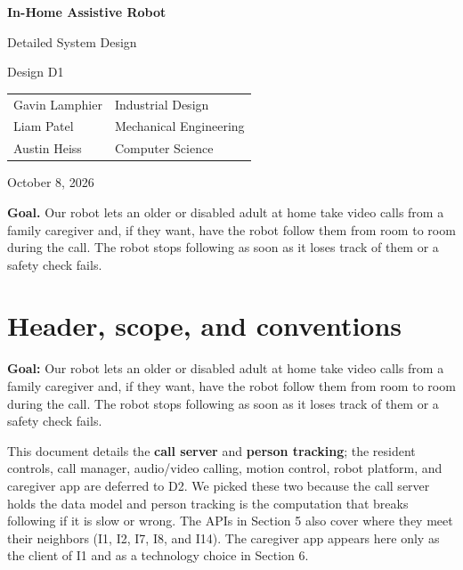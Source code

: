 \documentclass[12pt,letterpaper]{article}
\begin{document}
\begin{titlepage}
\centering
\vspace*{1.2in}
{\LARGE\bfseries In-Home Assistive Robot\par}
\vspace{0.25in}
{\Large Detailed System Design\par}
\vspace{0.12in}
{\large Design D1\par}
\vspace{0.8in}
\begin{tabular}{ll}
Gavin Lamphier & Industrial Design \\[6pt]
Liam Patel & Mechanical Engineering \\[6pt]
Austin Heiss & Computer Science \\[6pt]
\end{tabular}
\vspace{0.55in}
\par October 8, 2026
\vfill
\begin{minipage}{0.84\textwidth}
\textbf{Goal.} Our robot lets an older or disabled adult at home take video calls from a family caregiver and, if they want, have the robot follow them from room to room during the call. The robot stops following as soon as it loses track of them or a safety check fails.
\end{minipage}
\par\vspace{0.16in}{\small AI assisted with drafting and LaTeX formatting.\par}
\vspace*{0.6in}
\end{titlepage}

\section{Header, scope, and conventions}

\textbf{Goal:} Our robot lets an older or disabled adult at home take video calls from a family caregiver and, if they want, have the robot follow them from room to room during the call. The robot stops following as soon as it loses track of them or a safety check fails.

This document details the \textbf{call server} and \textbf{person tracking}; the resident controls, call manager, audio/video calling, motion control, robot platform, and caregiver app are deferred to D2. We picked these two because the call server holds the data model and person tracking is the computation that breaks following if it is slow or wrong. The APIs in Section 5 also cover where they meet their neighbors (I1, I2, I7, I8, and I14). The caregiver app appears here only as the client of I1 and as a technology choice in Section 6.
\end{document}
